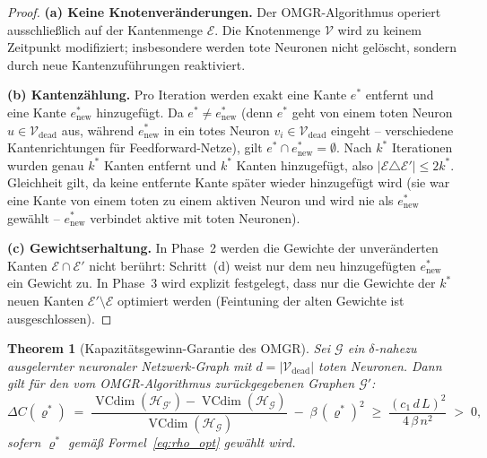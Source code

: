 \documentclass[12pt, a4paper, openany]{report}
\newtheorem{theorem}{Theorem}[chapter]
\newcommand{\calG}{\mathcal{G}}
\newcommand{\calH}{\mathcal{H}}
\newcommand{\calV}{\mathcal{V}}
\newcommand{\calE}{\mathcal{E}}
\DeclareMathOperator{\VC}{VCdim}
\begin{document}
\begin{proof}
\textbf{(a) Keine Knotenveränderungen.}
Der OMGR-Algorithmus operiert ausschließlich auf der Kantenmenge $\calE$.
Die Knotenmenge $\calV$ wird zu keinem Zeitpunkt modifiziert; insbesondere
werden tote Neuronen nicht gelöscht, sondern durch neue Kantenzuführungen
reaktiviert.

\textbf{(b) Kantenzählung.}
Pro Iteration werden exakt eine Kante $e^*$ entfernt und eine Kante
$e_{\mathrm{new}}^*$ hinzugefügt.  Da $e^* \neq e_{\mathrm{new}}^*$
(denn $e^*$ geht von einem toten Neuron $u \in \calV_{\mathrm{dead}}$ aus,
während $e_{\mathrm{new}}^*$ in ein totes Neuron $v_i \in \calV_{\mathrm{dead}}$
eingeht -- verschiedene Kantenrichtungen für Feedforward-Netze), gilt
$e^* \cap e_{\mathrm{new}}^* = \emptyset$.
Nach $k^*$ Iterationen wurden genau $k^*$ Kanten entfernt und $k^*$
Kanten hinzugefügt, also $|\calE \triangle \calE'| \leq 2k^*$.
Gleichheit gilt, da keine entfernte Kante später wieder hinzugefügt wird
(sie war eine Kante von einem toten zu einem aktiven Neuron und wird nie
als $e_{\mathrm{new}}^*$ gewählt -- $e_{\mathrm{new}}^*$ verbindet aktive
mit toten Neuronen).

\textbf{(c) Gewichtserhaltung.}
In Phase~2 werden die Gewichte der unveränderten Kanten $\calE \cap \calE'$ 
nicht berührt: Schritt~(d) weist nur dem neu hinzugefügten $e_{\mathrm{new}}^*$
ein Gewicht zu.  In Phase~3 wird explizit festgelegt, dass nur
die Gewichte der $k^*$ neuen Kanten $\calE' \setminus \calE$ optimiert werden
(Feintuning der alten Gewichte ist ausgeschlossen).
\end{proof}

\begin{theorem}[Kapazitätsgewinn-Garantie des OMGR]
\label{thm:omgr_capacity}
Sei $\calG$ ein $\delta$-nahezu ausgelernter neuronaler Netzwerk-Graph mit
$d = |\calV_{\mathrm{dead}}|$ toten Neuronen.  Dann gilt für den vom
OMGR-Algorithmus zurückgegebenen Graphen $\calG'$:
\begin{equation}
  \label{eq:omgr_capacity}
  \Delta C(\varrho^*)
  \;=\;
  \frac{\VC(\calH_{\calG'}) - \VC(\calH_{\calG})}{\VC(\calH_{\calG})}
  \;-\; \beta\,(\varrho^*)^2
  \;\geq\;
  \frac{(c_1\,d\,L)^2}{4\,\beta\,n^2}
  \;>\; 0,
\end{equation}
sofern $\varrho^*$ gemäß Formel~\eqref{eq:rho_opt} gewählt wird.
\end{theorem}
\end{document}
